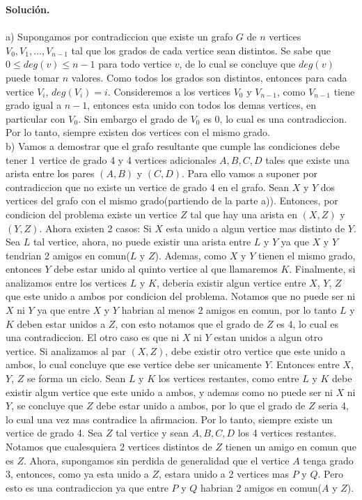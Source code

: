 \documentclass[12pt]{article}
\begin{document}
\textbf{Solución.} 
\\\\
a) Supongamos por contradiccion que existe un grafo $G$ de $n$ vertices $V_0, V_1, \ldots, V_{n-1}$ tal que los grados de cada vertice sean distintos. Se sabe que $0 \leq deg(v)  \leq n-1 $ para todo vertice $v$, de lo cual se concluye que $deg(v)$ puede tomar $n$ valores. Como todos los grados son distintos, entonces para cada vertice $V_i$, $deg(V_i) = i$. Consideremos a los vertices $V_0$ y $V_{n-1}$, como $V_{n-1}$ tiene grado igual a $n-1$, entonces esta unido con todos los demas vertices, en particular con $V_0$. Sin embargo el grado de $V_0$ es 0, lo cual es una contradiccion. Por lo tanto, siempre existen  dos vertices con el mismo grado.
\\
b) Vamos a demostrar que el grafo resultante que cumple las condiciones debe tener 1 vertice de grado 4 y 4 vertices adicionales $A, B, C, D$ tales que existe una arista entre los pares $(A,B)$ y $(C,D)$.
Para ello vamos a suponer por contradiccion que no existe un vertice de grado 4 en el grafo. Sean $X$ y $Y$ dos vertices del grafo con el mismo grado(partiendo de la parte a)). Entonces, por condicion del problema existe un vertice $Z$ tal que hay una arista en $(X,Z)$ y $(Y,Z)$. Ahora existen 2 casos: 
Si $X$ esta unido a algun vertice mas distinto de $Y$. Sea $L$ tal vertice, ahora, no puede existir una arista entre $L$ y $Y$ ya que $X$ y $Y$ tendrian 2 amigos en comun($L$ y $Z$). Ademas, como $X$ y $Y$ tienen el mismo grado, entonces $Y$ debe estar unido al quinto vertice al que llamaremos $K$. Finalmente, si analizamos entre los vertices $L$ y $K$, deberia existir algun vertice entre $X$, $Y$, $Z$ que este unido a ambos por condicion del problema. Notamos que no puede ser ni $X$ ni $Y$ ya que entre $X$ y $Y$ habrian al menos 2 amigos en comun, por lo tanto $L$ y $K$ deben estar unidos a $Z$, con esto notamos que el grado de $Z$ es 4, lo cual es una contradiccion. El otro caso es que ni $X$ ni $Y$ estan unidos a algun otro vertice. Si analizamos al par $(X,Z)$, debe existir otro vertice que este unido a ambos, lo cual concluye que ese vertice debe ser unicamente $Y$. Entonces entre $X$, $Y$, $Z$ se forma un ciclo. Sean $L$ y $K$ los vertices restantes, como entre $L$ y $K$ debe existir algun vertice que este unido a ambos, y ademas como no puede ser ni $X$ ni $Y$, se concluye que $Z$ debe estar unido a ambos, por lo que el grado de $Z$ seria 4, lo cual una vez mas contradice la afirmacion.
Por lo tanto, siempre existe un vertice de grado 4.
Sea $Z$ tal vertice y sean $A, B, C, D$ los 4 vertices restantes. Notamos que cualesquiera 2 vertices distintos de $Z$ tienen un amigo en comun que es $Z$. Ahora, supongamos sin perdida de generalidad que el vertice $A$ tenga grado 3, entonces, como ya esta unido a $Z$, estara unido a 2 vertices mas $P$ y $Q$. Pero esto es una contradiccion ya que entre $P$ y $Q$ habrian 2 amigos en comun($A$ y $Z$).
\end{document}
